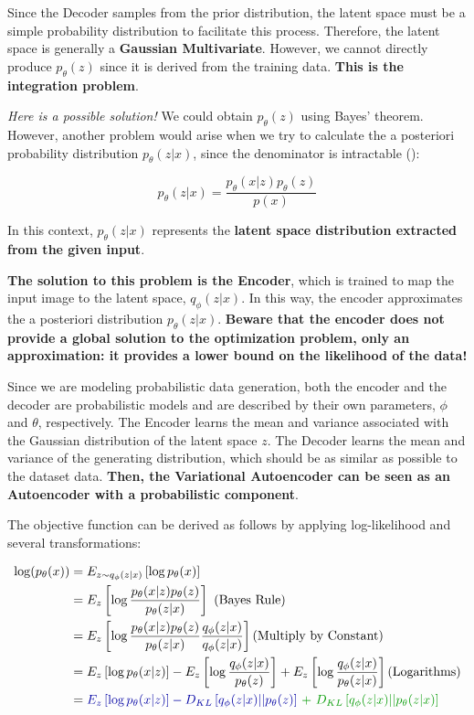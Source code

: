 Since the Decoder samples from the prior distribution, the latent space must be a simple probability distribution to facilitate this process. Therefore, the latent space is generally a \textbf{Gaussian Multivariate}. However, we cannot directly produce $p_{\theta}(z)$ since it is derived from the training data. \textbf{This is the integration problem}.

\textit{Here is a possible solution!} We could obtain $p_{\theta}(z)$ using Bayes' theorem. However, another problem would arise when we try to calculate the a posteriori probability distribution $p_{\theta}(z|x)$, since the denominator is intractable ():

$$p_{\theta}(z|x)= \frac{p_{\theta}(x|z)p_{\theta}(z)}{p(x)}$$

In this context, $p_{\theta}(z|x)$ represents the \textbf{latent space distribution extracted from the given input}.

\textbf{The solution to this problem is the Encoder}, which is trained to map the input image to the latent space, $q_{\phi}(z|x)$. In this way, the encoder approximates the a posteriori distribution $p_{\theta}(z|x)$. \textbf{\textcolor{myred}{Beware that the encoder does not provide a global solution to the optimization problem, only an approximation: it provides a lower bound on the likelihood of the data!}}

Since we are modeling probabilistic data generation, both the encoder and the decoder are probabilistic models and are described by their own parameters, $\phi$ and $\theta$, respectively. The Encoder learns the mean and variance associated with the Gaussian distribution of the latent space $z$. The Decoder learns the mean and variance of the generating distribution, which should be as similar as possible to the dataset data.  \textbf{Then, the Variational Autoencoder can be seen as an Autoencoder with a probabilistic component}.

The objective function can be derived as follows by applying log-likelihood and several transformations:

\begin{equation*} 
\begin{aligned}
\log (p_{\theta}(x)) &= E_{z \sim q_{\phi}(z|x)}\left[ \log p_{\theta}(x) \right]\\
&=E_{z }\left[ \log \frac{p_{\theta}(x|z) p_{\theta}(z)}{p_{\theta}(z|x)} \right]  \text{  (Bayes Rule)} \\
&=E_{z }\left[ \log \frac{p_{\theta}(x|z) p_{\theta}(z)}{p_{\theta}(z|x)} \frac{q_{\phi}(z|x) }{q_{\phi}(z|x)}\right] \text{(Multiply by Constant)} \\
&=E_{z }\left[ \log p_{\theta}(x|z) \right] - E_{z} \left[ \log \frac{q_{\phi}(z|x)}{ p_{\theta}(z)}\right] + E_{z} \left[ \log \frac{q_{\phi}(z|x)}{p_{\theta}(z|x)} \right]  \text{(Logarithms)} \\
&=\textcolor{mybluee}{E_{z }\left[ \log p_{\theta}(x|z) \right] - D_{KL} \left[ q_{\phi}(z|x)|| p_{\theta}(z)\right]}\textcolor{mygreen}{\ + \ D_{KL} \left[ q_{\phi}(z|x)||p_{\theta}(z|x) \right]} 
\end{aligned}
\end{equation*}


